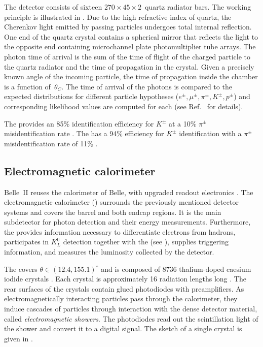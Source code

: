 The \TOP detector \cite{Fast:2017pff} consists of sixteen $270 \times 45 \times 2$~\cm quartz radiator bars.
The working principle is illustrated in .
Due to the high refractive index of quartz, the Cherenkov light emitted by passing particles undergoes total internal reflection.
One end of the quartz crystal contains a spherical mirror that reflects the light to the opposite end containing microchannel plate photomultiplier tube arrays.
The photon time of arrival is the sum of the time of flight of
the charged particle to the quartz radiator and the time of propagation in the crystal.
Given a precisely known angle of the incoming particle, the time of propagation inside the chamber is a function of~$\theta_C$.
The time of arrival of the photons is compared to the expected distributions for different particle hypotheses ($e^{\pm},\mu^{\pm},\pi^{\pm},K^{\pm},p^{\pm}$) and corresponding likelihood values are computed for each (see Ref.~\cite{Yonenaga:2020eby} for details).

The \TOP provides an 85\% identification efficiency for $K^{\pm}$ at a 10\% $\pi^{\pm}$ misidentification rate \cite{Kojima:2022qcl}.
The \ARICH has a 94\% efficiency for $K^{\pm}$ identification with a $\pi^{\pm}$ misidentification rate of 11\% \cite{Yonenaga:2020eby}.

\subsection{Electromagnetic calorimeter}\label{sec:ecl}

Belle~II reuses the calorimeter of Belle, with upgraded readout electronics \cite{Belle-II:2010dht}.
The electromagnetic calorimeter (\ECL) surrounds the previously mentioned detector systems and covers the barrel and both endcap regions.
It is the main subdetector for photon detection and their energy measurements.
Furthermore, the \ECL provides information necessary to differentiate electrons from hadrons, participates in $K_L^0$ detection together with the \KLM (see ),
supplies triggering information, and measures the luminosity collected by the detector.

The \ECL covers $\theta\in(12.4,155.1)^{\circ}$ and is composed of 8736 thalium-doped caesium iodide crystals \cite{Miyabayashi:2020xzp}.
Each crystal is approximately 16 radiation lengths long \cite{Aulchenko:2015nvy}.
The rear surfaces of the crystals contain glued photodiodes with preamplifiers.
As electromagnetically interacting particles pass through the calorimeter, they induce cascades of particles through interaction with the dense detector material, called \textit{electromagnetic showers}.
The photodiodes read out the scintillation light of the shower and convert it to a digital signal.
The sketch of a single \ECL crystal is given in .

